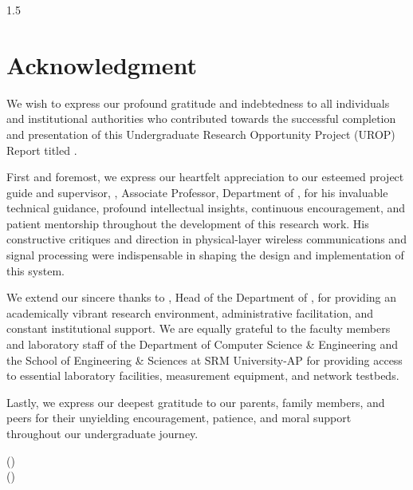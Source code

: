 \newpage
{}
\thispagestyle{empty}
\begin{spacing}{1.5}
\chapter*{Acknowledgment}

We wish to express our profound gratitude and indebtedness to all individuals and institutional authorities who contributed towards the successful completion and presentation of this Undergraduate Research Opportunity Project (UROP) Report titled {\bfseries \vtitle}.

First and foremost, we express our heartfelt appreciation to our esteemed project guide and supervisor, \textbf{\vguide}, Associate Professor, Department of \vdept, for his invaluable technical guidance, profound intellectual insights, continuous encouragement, and patient mentorship throughout the development of this research work. His constructive critiques and direction in physical-layer wireless communications and signal processing were indispensable in shaping the design and implementation of this system.

We extend our sincere thanks to \textbf{\vhod}, Head of the Department of \vdept, for providing an academically vibrant research environment, administrative facilitation, and constant institutional support. We are equally grateful to the faculty members and laboratory staff of the Department of Computer Science \& Engineering and the School of Engineering \& Sciences at SRM University-AP for providing access to essential laboratory facilities, measurement equipment, and network testbeds.

Lastly, we express our deepest gratitude to our parents, family members, and peers for their unyielding encouragement, patience, and moral support throughout our undergraduate journey.

\vspace{1.5cm}
\begin{flushright}
\textbf{\vnameone} (\vregisternumberone)\\
\textbf{\vnametwo} (\vregisternumbertwo)
\end{flushright}

\end{spacing}
